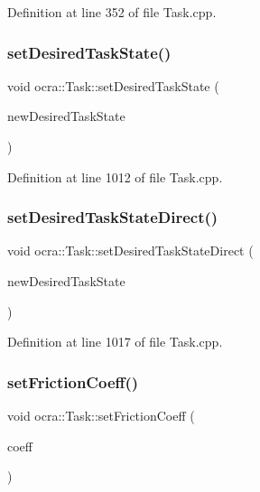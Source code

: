 Definition at line 352 of file Task.\+cpp.

\hypertarget{classocra_1_1Task_ac14252b35faa2ed8eed4cc5db629ce94}{}\label{classocra_1_1Task_ac14252b35faa2ed8eed4cc5db629ce94} 
\subsubsection{\texorpdfstring{set\+Desired\+Task\+State()}{setDesiredTaskState()}}
{\footnotesize\ttfamily void ocra\+::\+Task\+::set\+Desired\+Task\+State (\begin{DoxyParamCaption}\item[{const \hyperlink{classocra_1_1TaskState}{Task\+State} \&}]{new\+Desired\+Task\+State }\end{DoxyParamCaption})}



Definition at line 1012 of file Task.\+cpp.

\hypertarget{classocra_1_1Task_a44ccc493a8a4931e11c3fcfcd30d991c}{}\label{classocra_1_1Task_a44ccc493a8a4931e11c3fcfcd30d991c} 
\subsubsection{\texorpdfstring{set\+Desired\+Task\+State\+Direct()}{setDesiredTaskStateDirect()}}
{\footnotesize\ttfamily void ocra\+::\+Task\+::set\+Desired\+Task\+State\+Direct (\begin{DoxyParamCaption}\item[{const \hyperlink{classocra_1_1TaskState}{Task\+State} \&}]{new\+Desired\+Task\+State }\end{DoxyParamCaption})}



Definition at line 1017 of file Task.\+cpp.

\hypertarget{classocra_1_1Task_ae37c47d2481ebfa034dc79cbf149776a}{}\label{classocra_1_1Task_ae37c47d2481ebfa034dc79cbf149776a} 
\subsubsection{\texorpdfstring{set\+Friction\+Coeff()}{setFrictionCoeff()}}
{\footnotesize\ttfamily void ocra\+::\+Task\+::set\+Friction\+Coeff (\begin{DoxyParamCaption}\item[{double}]{coeff }\end{DoxyParamCaption})}



